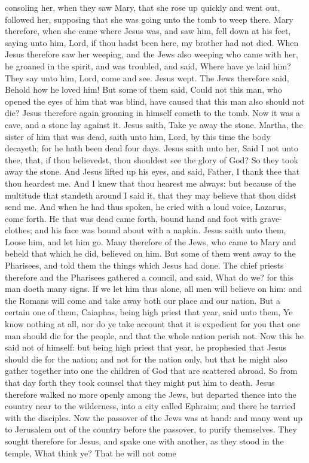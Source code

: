 consoling her, when they saw Mary, that she rose up quickly and went out, followed her, supposing that she was going unto the tomb to weep there. Mary therefore, when she came where Jesus was, and saw him, fell down at his feet, saying unto him, Lord, if thou hadst been here, my brother had not died. When Jesus therefore saw her weeping, and the Jews also weeping who came with her, he groaned in the spirit, and was troubled, and said, Where have ye laid him? They say unto him, Lord, come and see. Jesus wept. The Jews therefore said, Behold how he loved him! But some of them said, Could not this man, who opened the eyes of him that was blind, have caused that this man also should not die? Jesus therefore again groaning in himself cometh to the tomb. Now it was a cave, and a stone lay against it. Jesus saith, Take ye away the stone. Martha, the sister of him that was dead, saith unto him, Lord, by this time the body decayeth; for he hath been dead four days. Jesus saith unto her, Said I not unto thee, that, if thou believedst, thou shouldest see the glory of God? So they took away the stone. And Jesus lifted up his eyes, and said, Father, I thank thee that thou heardest me. And I knew that thou hearest me always: but because of the multitude that standeth around I said it, that they may believe that thou didst send me. And when he had thus spoken, he cried with a loud voice, Lazarus, come forth. He that was dead came forth, bound hand and foot with grave-clothes; and his face was bound about with a napkin. Jesus saith unto them, Loose him, and let him go.  Many therefore of the Jews, who came to Mary and beheld that which he did, believed on him. But some of them went away to the Pharisees, and told them the things which Jesus had done.  The chief priests therefore and the Pharisees gathered a council, and said, What do we? for this man doeth many signs. If we let him thus alone, all men will believe on him: and the Romans will come and take away both our place and our nation. But a certain one of them, Caiaphas, being high priest that year, said unto them, Ye know nothing at all, nor do ye take account that it is expedient for you that one man should die for the people, and that the whole nation perish not. Now this he said not of himself: but being high priest that year, he prophesied that Jesus should die for the nation; and not for the nation only, but that he might also gather together into one the children of God that are scattered abroad. So from that day forth they took counsel that they might put him to death.  Jesus therefore walked no more openly among the Jews, but departed thence into the country near to the wilderness, into a city called Ephraim; and there he tarried with the disciples. Now the passover of the Jews was at hand: and many went up to Jerusalem out of the country before the passover, to purify themselves. They sought therefore for Jesus, and spake one with another, as they stood in the temple, What think ye? That he will not come 
